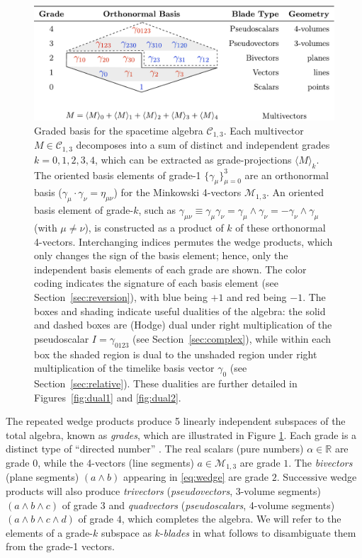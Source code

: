 \documentclass[1p,sort&compress]{elsarticle}
\numberwithin{equation}{section}
\newcommand{\mean}[1]{\langle #1 \rangle}
\begin{document}
\begin{figure}[t]
  \begin{center}
    \includegraphics[width=\columnwidth]{Fig2.pdf}
  \end{center}
  \caption[Graded basis for spacetime algebra]{Graded basis for the spacetime algebra $\mathcal{C}_{1,3}$.  Each multivector $M\in\mathcal{C}_{1,3}$ decomposes into a sum of distinct and independent grades $k=0,1,2,3,4$, which can be extracted as grade-projections $\mean{M}_k$.  The oriented basis elements of grade-1 $\{\gamma_\mu\}_{\mu=0}^3$ are an orthonormal basis ($\gamma_\mu \cdot \gamma_\nu = \eta_{\mu\nu}$) for the Minkowski 4-vectors $\mathcal{M}_{1,3}$.  An oriented basis element of grade-$k$, such as $\gamma_{\mu\nu} \equiv \gamma_\mu\gamma_\nu = \gamma_\mu\wedge\gamma_\nu = - \gamma_\nu \wedge \gamma_\mu$ (with $\mu\neq\nu$), is constructed as a product of $k$ of these orthonormal 4-vectors.  Interchanging indices permutes the wedge products, which only changes the sign of the basis element; hence, only the independent basis elements of each grade are shown.  The color coding indicates the signature of each basis element (see Section~\ref{sec:reversion}), with blue being $+1$ and red being $-1$.  The boxes and shading indicate useful dualities of the algebra: the solid and dashed boxes are (Hodge) dual under right multiplication of the pseudoscalar $I = \gamma_{0123}$ (see Section~\ref{sec:complex}), while within each box the shaded region is dual to the unshaded region under right multiplication of the timelike basis vector $\gamma_0$ (see Section~\ref{sec:relative}).  These dualities are further detailed in Figures~\ref{fig:dual1} and \ref{fig:dual2}.}
  \label{fig:grades}
\end{figure}

The repeated wedge products produce 5 linearly independent subspaces of the total algebra, known as \emph{grades}, which are illustrated in Figure \ref{fig:grades}.  Each grade is a distinct type of ``directed number'' \cite{Ablamowicz2004}.  The real scalars (pure numbers) $\alpha\in \mathbb{R}$ are grade $0$, while the 4-vectors (line segments) $a\in\mathcal{M}_{1,3}$ are grade $1$.  The \emph{bivectors} (plane segments) $(a\wedge b)$ appearing in \eqref{eq:wedge} are grade $2$.  Successive wedge products will also produce \emph{trivectors} (\emph{pseudovectors}, 3-volume segments) $(a\wedge b\wedge c)$ of grade $3$ and \emph{quadvectors} (\emph{pseudoscalars}, 4-volume segments) $(a\wedge b\wedge c\wedge d)$ of grade $4$, which completes the algebra.  We will refer to the elements of a grade-$k$ subspace as $k$-\emph{blades} in what follows to disambiguate them from the grade-1 vectors.  
\end{document}
